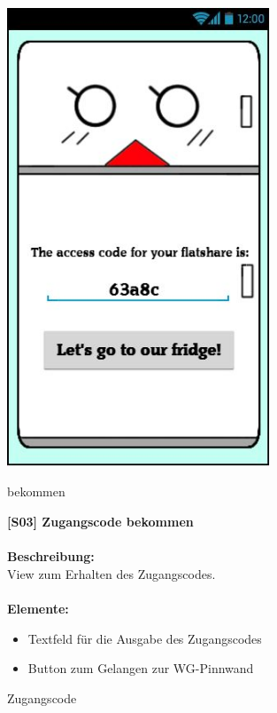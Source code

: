\documentclass[a4paper]{scrreprt}
\begin{document}
    	\begin{figure}[h]
    		\begin{minipage}[b]{0.4\linewidth}
    			
    			\flushright
    			\centering
    			\includegraphics[width=0.7\textwidth]{fridget_accesscode.JPG}
    			\caption{Zugangscode} {bekommen}
    			\label{fig:figure1}
    			\vspace{13mm}
    		\end{minipage}
    		\hspace{0.5cm}
    		\begin{minipage}[b]{0.55\linewidth}
    			\flushleft
    			
    			\textbf{{[}S03{]} Zugangscode bekommen} \\
    			\hfill
    			\\\textbf{Beschreibung:} \\
    			View zum Erhalten des Zugangscodes.\\
    			\hfill
    			\\\textbf{Elemente:}
    			\begin{itemize}
    				\renewcommand\labelitemi{--}
    				\item Textfeld für die Ausgabe des Zugangscodes
    				\item Button zum Gelangen zur WG-Pinnwand
    				

\end{itemize}
\end{minipage}
\end{figure}
\end{document}
